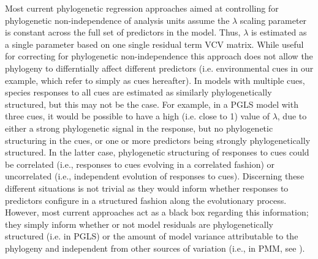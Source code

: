 \documentclass{article}\usepackage[]{graphicx}\usepackage[]{color}
\begin{document}
Most current phylogenetic regression approaches aimed at controlling for phylogenetic non-independence of analysis units \citep[i.e. species, see][]{revell2010phylogenetic} assume the $\lambda$ scaling parameter is constant across the full set of predictors in the model. Thus, $\lambda$ is estimated as a single parameter based on one single residual term VCV matrix. While useful for correcting for phylogenetic non-independence this approach does not allow the phylogeny to differntially affect different predictors (i.e. environmental cues in our example, which refer to simply as cues hereafter). In models with multiple cues, species responses to all cues are estimated as similarly phylogenetically structured, but this may not be the case. For example, in a PGLS model with three cues, it would be possible to have a high (i.e. close to 1) value of $\lambda$, due to either a strong phylogenetic signal in the response, but no phylogenetic structuring in the cues, or one or more predictors being strongly phylogenetically structured. In the latter case, phylogenetic structuring of responses to cues could be correlated (i.e., responses to cues evolving in a correlated fashion) or uncorrelated (i.e., independent evolution of responses to cues). Discerning these different situations is not trivial as they would inform whether responses to predictors configure in a structured fashion along the evolutionary process. However, most current approaches act as a black box regarding this information; they simply inform whether or not model residuals are phylogenetically structured (i.e. in PGLS) or the amount of model variance attributable to the phylogeny and independent from other sources of variation (i.e., in PMM, see \cite{housworth2004phylogenetic}).\\
\end{document}
